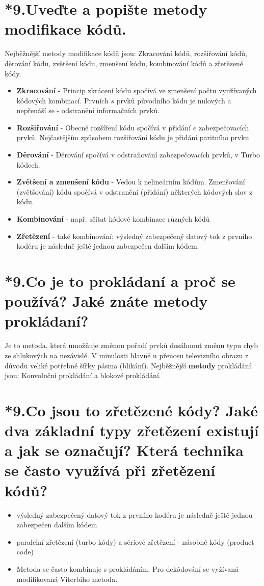 \section{*9.Uveďte a popište metody modifikace kódů.}
Nejběžnější metody modifikace kódů jsou: Zkracování kódů, rozšiřování kódů, děrování kódu, zvětšení kódu, zmenšení kódu, kombinování kódů a zřetězené kódy.
\begin{itemize}
    \item \textbf{Zkracování} - Princip zkrácení kódu spočívá ve zmenšení počtu využívaných kódových kombinací. Prvních $s$ prvků původního kódu je nulových a nepřenáší se - odstranění informačních prvků.
    \item \textbf{Rozšiřování} - Obecně rozšíření kódu spočívá v přidání $e$ zabezpečovacích prvků. Nejčastějším způsobem rozšiřování kódu je přidání paritního prvku
    \item \textbf{Děrování} - Děrování spočívá v odstraňování zabezpečovacích prvků, v Turbo kódech.
    \item \textbf{Zvětšení a zmenšení kódu} -  Vedou k nelineárním kódům. Zmenšování (zvětšování) kódu spočívá v odstranění (přidání) některých kódových slov z kódu.
    \item \textbf{Kombinování} - např. sčítat kódové kombinace různých kódů
    \item \textbf{Zřetězení} - také kombinování; výsledný zabezpečený datový tok z prvního kodéru je následně ještě jednou zabezpečen dalším kódem.
\end{itemize}

\section{*9.Co je to prokládaní a proč se používá? Jaké znáte metody prokládaní?}
Je to metoda, která umožňuje změnou pořadí prvků dosáhnout změnu typu chyb ze shlukových na nezávislé. V minulosti hlavně u přenosu televizního obrazu z důvodu veliké potřebné šířky pásma (blikání). Nejběžnější \textbf{metody} prokládání jsou: Konvoluční prokládání a blokové prokládání.

\section{*9.Co jsou to zřetězené kódy? Jaké dva základní typy zřetězení existují a jak se označují? Která technika se často využívá při zřetězení kódů?}
\begin{itemize}
    \item výsledný zabezpečený datový tok z prvního kodéru je následně ještě jednou zabezpečen dalším kódem
    \item paralelní zřetězení (turbo kódy) a sériové zřetězení - násobné kódy (product code)
    \item  Metoda se často kombinuje s prokládáním. Pro dekódování se vyžívaná modifikovaná Viterbiho metoda.
\end{itemize}
